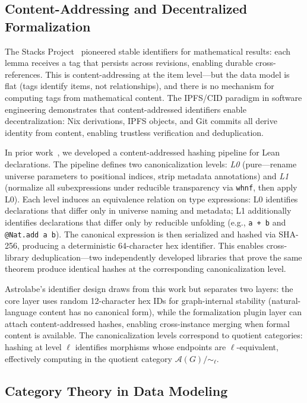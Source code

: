 \subsection{Content-Addressing and Decentralized Formalization}
\label{sec:bg-content-addressing}

The Stacks Project~\cite{deJong} pioneered stable identifiers for mathematical results: each lemma receives a tag that persists across revisions, enabling durable cross-references. This is content-addressing at the item level---but the data model is flat (tags identify items, not relationships), and there is no mechanism for computing tags from mathematical content. The IPFS/CID paradigm in software engineering demonstrates that content-addressed identifiers enable decentralization: Nix derivations, IPFS objects, and Git commits all derive identity from content, enabling trustless verification and deduplication.

In prior work~\cite{LiParisSeverini2026}, we developed a content-addressed hashing pipeline for Lean declarations. The pipeline defines two canonicalization levels: \emph{L0} (pure---rename universe parameters to positional indices, strip metadata annotations) and \emph{L1} (normalize all subexpressions under reducible transparency via \texttt{whnf}, then apply L0). Each level induces an equivalence relation on type expressions: L0 identifies declarations that differ only in universe naming and metadata; L1 additionally identifies declarations that differ only by reducible unfolding (e.g., \texttt{a + b} and \texttt{@Nat.add a b}). The canonical expression is then serialized and hashed via SHA-256, producing a deterministic 64-character hex identifier. This enables cross-library deduplication---two independently developed libraries that prove the same theorem produce identical hashes at the corresponding canonicalization level.

Astrolabe's identifier design draws from this work but separates two layers: the core layer uses random 12-character hex IDs for graph-internal stability (natural-language content has no canonical form), while the formalization plugin layer can attach content-addressed hashes, enabling cross-instance merging when formal content is available. The canonicalization levels correspond to quotient categories: hashing at level $\ell$ identifies morphisms whose endpoints are $\ell$-equivalent, effectively computing in the quotient category $\mathcal{A}(G)/{\sim_\ell}$.


\subsection{Category Theory in Data Modeling}
\label{sec:bg-category-theory}

